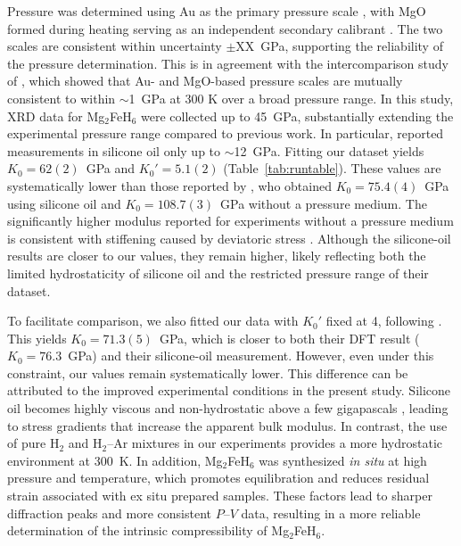 \documentclass[draft,jgrga,12pt]{agujournal2019}
\begin{document}
Pressure was determined using Au as the primary pressure scale \cite{fei_internally_2007}, with MgO formed during heating serving as an independent secondary calibrant \cite{dorogokupets_equations_2007}. The two scales are consistent within uncertainty $\pm$XX~GPa, supporting the reliability of the pressure determination. 
This is in agreement with the intercomparison study of , which showed that Au- and MgO-based pressure scales are mutually consistent to within $\sim$1~GPa at 300 K over a broad pressure range.
In this study, XRD data for Mg$_2$FeH$_6$ were collected up to 45~{GPa}, substantially extending the experimental pressure range compared to previous work. 
In particular,  reported measurements in silicone oil only up to $\sim$12~{GPa}. 
Fitting our dataset yields $K_0 = 62(2)$~GPa and $K_0' = 5.1(2)$ (Table~\ref{tab:runtable}). 
These values are systematically lower than those reported by , who obtained $K_0 = 75.4(4)$~{GPa} using silicone oil and $K_0 = 108.7(3)$~{GPa} without a pressure medium. 
The significantly higher modulus reported for experiments without a pressure medium is consistent with stiffening caused by deviatoric stress \cite{mao_theory_2007}. 
Although the silicone-oil results are closer to our values, they remain higher, likely reflecting both the limited hydrostaticity of silicone oil and the restricted pressure range of their dataset.

To facilitate comparison, we also fitted our data with $K_0'$ fixed at 4, following . 
This yields $K_0 = 71.3(5)$~{GPa}, which is closer to both their DFT result ($K_0 = 76.3$~{GPa}) and their silicone-oil measurement. However, even under this constraint, our values remain systematically lower. 
This difference can be attributed to the improved experimental conditions in the present study. 
Silicone oil becomes highly viscous and non-hydrostatic above a few gigapascals \cite{klotz_hydrostatic_2009}, leading to stress gradients that increase the apparent bulk modulus. In contrast, the use of pure H$_2$ and H$_2$–Ar mixtures in our experiments provides a more hydrostatic environment at 300~K. In addition, Mg$_2$FeH$_6$ was synthesized \textit{in situ} at high pressure and temperature, which promotes equilibration and reduces residual strain associated with ex situ prepared samples. These factors lead to sharper diffraction peaks and more consistent $P$–$V$ data, resulting in a more reliable determination of the intrinsic compressibility of Mg$_2$FeH$_6$.
\end{document}
